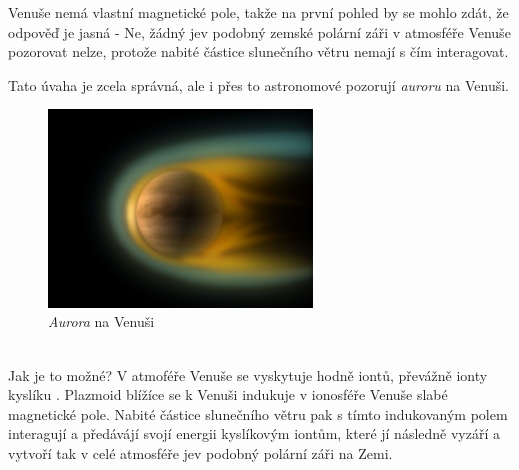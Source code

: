 \documentclass{../../../../style/mkimain}
\begin{document}
\noindent{}
\proborigin{}
\klein
Venuše nemá vlastní magnetické pole, takže na první pohled by se mohlo zdát, že odpověď je jasná - Ne, žádný jev podobný zemské polární záři v 
atmosféře Venuše pozorovat nelze, protože nabité částice slunečního větru nemají s čím interagovat.

Tato úvaha je zcela správná, ale i přes to astronomové pozorují \emph{auroru} na Venuši.
\begin{figure}[htpb]
    \begin{center}
    \includegraphics[width=7cm]{images/venus-aurora.jpg}
    \\
    \emph{Aurora} na Venuši\footnotemark
    \end{center}
\end{figure}
\\ Jak je to možné? V atmoféře Venuše se vyskytuje hodně iontů, převážně ionty kyslíku . Plazmoid blížíce se k Venuši indukuje v 
ionosféře Venuše slabé magnetické pole. Nabité částice slunečního větru pak s tímto indukovaným polem interagují a předávájí svojí energii 
kyslíkovým iontům, které jí následně vyzáří a vytvoří tak v celé atmosféře jev podobný polární záři na Zemi. 
\end{document}
